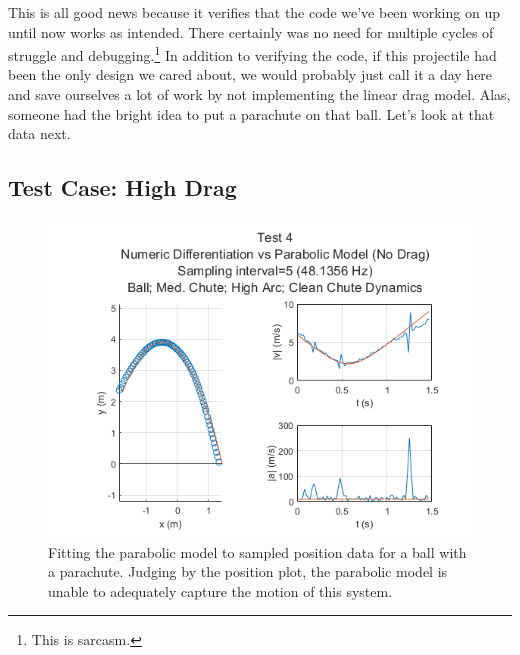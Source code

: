 This is all good news because it verifies that the code we've been working on up until now works as intended. There certainly was no need for multiple cycles of struggle and debugging.\footnote{This is sarcasm.} In addition to verifying the code, if this projectile had been the only design we cared about, we would probably just call it a day here and save ourselves a lot of work by not implementing the linear drag model. Alas, someone had the bright idea to put a parachute on that ball. Let's look at that data next.


\subsection{Test Case: High Drag}


\begin{figure}[t]
\centering
\includegraphics[width=0.9\linewidth]{images/Analysis1_Test4_Fig5_NoDrag.png}
\caption{\label{fig:Analysis1_Test4_Fig5_NoDrag} Fitting the parabolic model to sampled position data for a ball with a parachute. Judging by the position plot, the parabolic model is unable to adequately capture the motion of this system.}
\end{figure}


